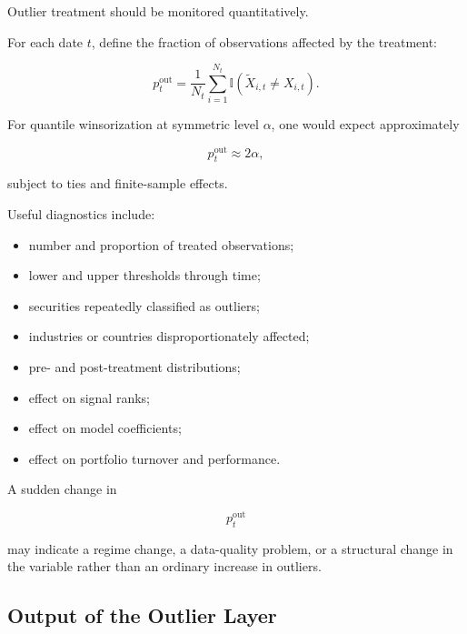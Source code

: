 \documentclass[11pt,a4paper]{article}
\begin{document}
Outlier treatment should be monitored quantitatively.

For each date $t$, define the fraction of observations affected by the
treatment:

\begin{equation}
\boxed{
p_t^{\mathrm{out}}
=
\frac{
1
}{
N_t
}
\sum_{i=1}^{N_t}
\mathbb{I}
\left(
\widetilde{X}_{i,t}
\neq
X_{i,t}
\right).
}
\end{equation}

For quantile winsorization at symmetric level $\alpha$, one would expect
approximately

\begin{equation}
p_t^{\mathrm{out}}
\approx
2\alpha,
\end{equation}

subject to ties and finite-sample effects.

Useful diagnostics include:

\begin{itemize}
    \item number and proportion of treated observations;
    \item lower and upper thresholds through time;
    \item securities repeatedly classified as outliers;
    \item industries or countries disproportionately affected;
    \item pre- and post-treatment distributions;
    \item effect on signal ranks;
    \item effect on model coefficients;
    \item effect on portfolio turnover and performance.
\end{itemize}

A sudden change in

\begin{equation}
p_t^{\mathrm{out}}
\end{equation}

may indicate a regime change, a data-quality problem, or a structural change in
the variable rather than an ordinary increase in outliers.


\subsection{Output of the Outlier Layer}
\label{subsec:outlier_layer_output}
\end{document}
